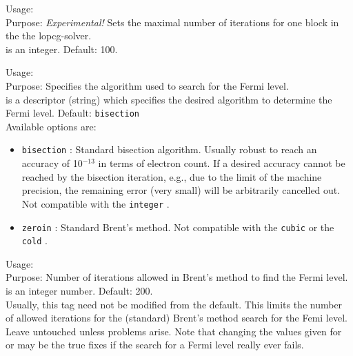{
  \noindent
  Usage:   \\[1.0ex]
  Purpose: \emph{Experimental!} Sets the maximal number of iterations for one
    block in the the lopcg-solver.\\[1.0ex]
   is an integer. Default: 100. \\
}

{
  \noindent
  Usage:   \\[1.0ex]
  Purpose: Specifies the algorithm used to search for the Fermi level. \\[1.0ex]
   is a descriptor (string) which specifies the desired algorithm
    to determine the Fermi level.  Default: \texttt{bisection} \\
}
Available options are:
\begin{itemize}
  \item \texttt{bisection} : Standard bisection algorithm. Usually robust to
    reach an accuracy of 10$^{-13}$ in terms of electron count. If a desired
    accuracy cannot be reached by the bisection iteration, e.g., due to the
    limit of the machine precision, the remaining error (very small) will be
    arbitrarily cancelled out. Not compatible with the \texttt{integer}
    .
  \item \texttt{zeroin} : Standard Brent's method. Not compatible with the
    \texttt{cubic} or the \texttt{cold} .
\end{itemize}

{
  \noindent
  Usage:   \\[1.0ex]
  Purpose: Number of iterations allowed in Brent's method to find the Fermi
    level. \\[1.0ex]
   is an integer number. Default: 200. \\
}
Usually, this tag need not be modified from the default. This limits the number
of allowed iterations for the (standard) Brent's method search for the Femi
level. Leave untouched unless problems arise. Note that changing the values
given for  or  may be the true
fixes if the search for a Fermi level really ever fails.

